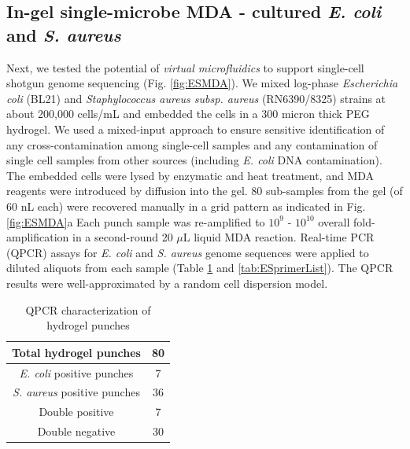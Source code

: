 \subsection{In-gel single-microbe MDA - cultured \textit{E. coli}  and \textit{S. aureus}}
Next, we tested the potential of \textit{virtual microfluidics} to support single-cell shotgun genome sequencing (Fig. \ref{fig:ESMDA}). We mixed log-phase \textit{Escherichia coli} (BL21) and \textit{Staphylococcus aureus subsp. aureus} (RN6390\slash 8325) strains at about 200,000 cells\slash mL and embedded the cells in a 300 micron thick PEG hydrogel. We used a mixed-input approach to ensure sensitive identification of any cross-contamination among single-cell samples and any contamination of single cell samples from other sources (including \textit{E. coli}  DNA contamination). The embedded cells were lysed by enzymatic and heat treatment, and MDA reagents were introduced by diffusion into the gel. 80 sub-samples from the gel (of 60 nL each) were recovered manually in a grid pattern as indicated in Fig. \ref{fig:ESMDA}a Each punch sample was re-amplified to $10^{9}$ - $10^{10}$ overall fold-amplification in a second-round 20 $\mu$L liquid MDA reaction. Real-time PCR (QPCR) assays for \textit{E. coli}  and \textit{S. aureus}  genome sequences were applied to diluted aliquots from each sample (Table \ref{tab:QpcrHydrogel} and \ref{tab:ESprimerList}). The QPCR results were well-approximated by a random cell dispersion model.


\begin{table}
\centering 
\caption{QPCR characterization of hydrogel punches}
\label{tab:QpcrHydrogel}
\begin{adjustbox}{max width=0.7\textwidth}
\begin{tabular}{c||c} 

\hline 
Total hydrogel punches & 80 \\ 
\hline
\textit{E. coli} positive punches & 7  \\
\hline
\textit{S. aureus} positive punches & 36 \\
\hline
Double positive & 7 \\
\hline
Double negative & 30 \\
\hline
\end{tabular}
\end{adjustbox}
\end{table}


